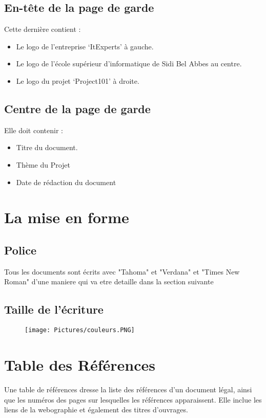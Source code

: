 \documentclass[11pt,fleqn]{book} %
\begin{document}
\subsection{ En-tête de la page de garde}
Cette dernière contient :
\begin{itemize}
    \item  Le logo de l’entreprise ‘ItExperts’ à gauche.
    \item Le logo de l’école supérieur d’informatique de Sidi Bel Abbes au centre.
     \item Le logo du projet ‘Project101’ à droite.
\end{itemize}

\subsection{ Centre de la page de garde}
Elle doit contenir :
\begin{itemize}

   \item Titre du document.
    \item Thème du Projet 
    \item Date de rédaction du document 
\end{itemize}
\section{ La mise en forme}
\subsection{Police}
Tous les documents sont écrits avec "Tahoma" et "Verdana" et "Times New Roman" d'une maniere qui va etre detaille dans la section suivante
\subsection{Taille de l’écriture}

\begin{figure}[h]
    \centering
    \texttt{[image: Pictures/couleurs.PNG]}
    \label{fig:pca}
\end{figure}

\section{ Table des Références}
Une table de références dresse la liste des références d'un document légal, ainsi que les 
numéros des pages sur lesquelles les références apparaissent. Elle inclue les liens de la 
webographie et également des titres d’ouvrages.
\end{document}
